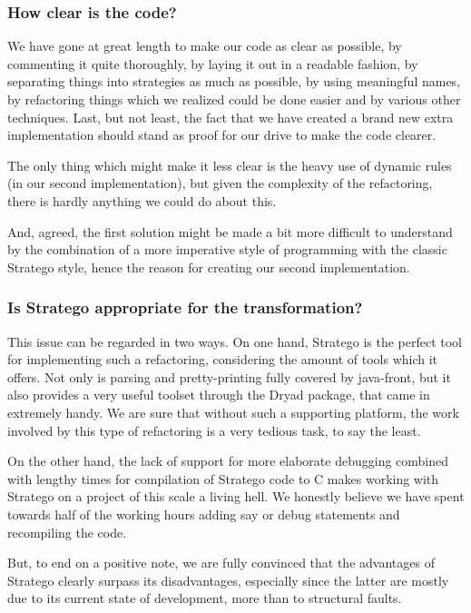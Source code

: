 \documentclass[a4paper,10pt]{article}
\begin{document}
\subsubsection*{How clear is the code?}

We have gone at great length to make our code as clear as
possible, by commenting it quite thoroughly, by laying it out
in a readable fashion, by separating things into strategies
as much as possible, by using meaningful names, by refactoring
things which we realized could be done easier and by various
other techniques. Last, but not least, the fact that we have
created a brand new extra implementation should stand as
proof for our drive to make the code clearer.

The only thing which might make it less clear is the heavy
use of dynamic rules (in our second implementation), but
given the complexity of the refactoring, there is hardly anything
we could do about this.

And, agreed, the first solution might be made a bit more difficult
to understand by the combination of a more imperative style of
programming with the classic Stratego style, hence the reason
for creating our second implementation.

\subsubsection*{Is Stratego appropriate for the transformation?}

This issue can be regarded in two ways. On one hand, Stratego is
the perfect tool for implementing such a refactoring, considering
the amount of tools which it offers. Not only is parsing and
pretty-printing fully covered by java-front, but it also provides a
very useful toolset through the Dryad package, that came in extremely
handy. We are sure that without such a supporting platform, the
work involved by this type of refactoring is a very tedious task, to
say the least.

On the other hand, the lack of support for more elaborate debugging
combined with lengthy times for compilation of Stratego code to C
makes working with Stratego on a project of this scale a living hell.
We honestly believe we have spent towards half of the working
hours adding \textsf{say} or \textsf{debug} statements and
recompiling the code.

But, to end on a positive note, we are fully convinced that
the advantages of Stratego clearly surpass its disadvantages, especially
since the latter are mostly due to its current state of development, more
than to structural faults.
\end{document}
